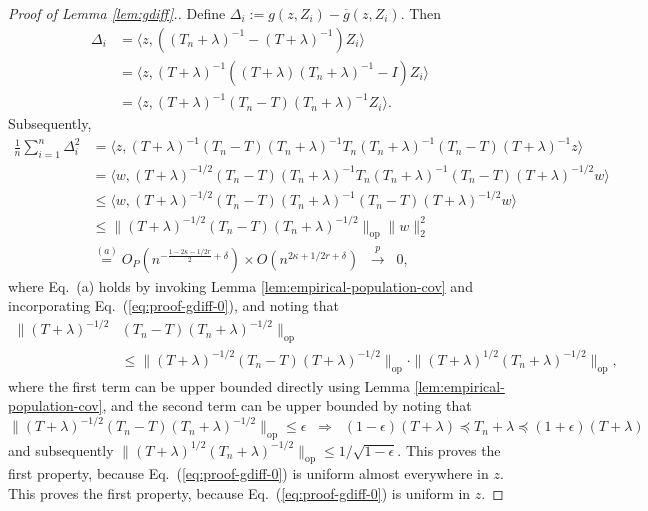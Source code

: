 \documentclass[aos]{imsart}
\renewcommand{\bar}{\overline}
\newcommand{\op}{\mathrm{op}}
\newcommand{\pd}[1]{%
	{ \color{blue} PD: #1}%
}
\theoremstyle{plain}
\theoremstyle{definition}
\theoremstyle{definition}
\begin{document}
\begin{appendix}
\begin{proof}[Proof of Lemma \ref{lem:gdiff}.]
Define $\Delta_i := g(z,Z_i)-\bar g(z,Z_i)$. Then
\begin{align*}
\Delta_i &= \langle z,((T_n+\lambda )^{-1}-(T+\lambda )^{-1})Z_i\rangle\nonumber\\
&= \langle z, (T+\lambda )^{-1}((T+\lambda )(T_n+\lambda )^{-1}-I)Z_i\rangle\nonumber\\
&= \langle z, (T+\lambda )^{-1}(T_n-T)(T_n+\lambda )^{-1}Z_i\rangle.
\end{align*}
Subsequently,
\begin{align}
\frac{1}{n}\sum_{i=1}^n \Delta_i^2 &= \langle z, (T+\lambda)^{-1}(T_n-T)(T_n+\lambda)^{-1}T_n(T_n+\lambda)^{-1}(T_n-T)(T+\lambda)^{-1}z\rangle\nonumber\\
&= \langle w, (T+\lambda)^{-1/2}(T_n-T)(T_n+\lambda)^{-1}T_n(T_n+\lambda)^{-1}(T_n-T)(T+\lambda)^{-1/2}w\rangle\nonumber\\
&\leq \langle w, (T+\lambda)^{-1/2}(T_n-T)(T_n+\lambda)^{-1}(T_n-T)(T+\lambda)^{-1/2}w\rangle\nonumber\\
&\leq \|(T+\lambda)^{-1/2}(T_n-T)(T_n+\lambda)^{-1/2}\|_\op\|w\|_2^2\nonumber\\
&\overset{(a)}{=} O_P\left(n^{-\frac{1-2\kappa-1/2r}{2}+\delta}\right)\times O(n^{2\kappa+1/2r+\delta}) \;\;\overset{p}{\to} \;\;0,
\end{align}
where Eq.~(a) holds by invoking Lemma \ref{lem:empirical-population-cov} and incorporating Eq.~(\ref{eq:proof-gdiff-0}), {\color{magenta}and noting that
\begin{align*}
\|(T+\lambda)^{-1/2}&(T_n-T)(T_n+\lambda)^{-1/2}\|_\op \nonumber\\
&\leq \|(T+\lambda)^{-1/2}(T_n-T)(T+\lambda)^{-1/2}\|_\op \cdot \|(T+\lambda)^{1/2}(T_n+\lambda)^{-1/2}\|_\op,
\end{align*}
where the first term can be upper bounded directly using Lemma \ref{lem:empirical-population-cov}, and the second term can be upper bounded by noting that 
$$
\|(T+\lambda)^{-1/2}(T_n-T)(T_n+\lambda)^{-1/2}\|_\op \leq \epsilon \;\;\Longrightarrow\;\; (1-\epsilon)(T+\lambda) \preceq T_n+\lambda \preceq (1+\epsilon)(T+\lambda)
$$
and subsequently $\|(T+\lambda)^{1/2}(T_n+\lambda)^{-1/2}\|_\op \leq 1/\sqrt{1-\epsilon}$.
}
This proves the first property, because Eq.~(\ref{eq:proof-gdiff-0}) is uniform almost everywhere in $z$. This proves the first property, because Eq.~(\ref{eq:proof-gdiff-0}) is uniform in $z$.



\end{proof}
\end{appendix}
\end{document}
